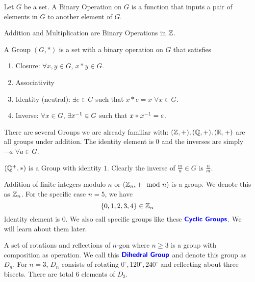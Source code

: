 \begin{definition*}
    Let $G$ be a set. A \alert{Binary Operation} on $G$ is a function that inputs a pair of elements in $G$ to another element of $G$.
\end{definition*}
\begin{example*}
    Addition and Multiplication are Binary Operations in $\mathbb Z$.
\end{example*}
\begin{definition*}
    A \alert{Group} $(G,\ast)$ is a set with a binary operation on $G$ that satisfies
    \begin{enumerate}
        \item Closure: $\forall x,y \in G$, $x \ast y \in G$.
        \item Associativity
        \item Identity (neutral): $\exists e \in G$ such that $x \ast e = x$ $\forall x \in G$.
        \item Inverse: $\forall x \in G$, $\exists x ^{-1} \in G$ such that $x \ast x ^{-1} = e$.
    \end{enumerate}
\end{definition*}
\begin{example*}
    There are several Groups we are already familiar with: $(\mathbb Z, +),(\mathbb Q, +),(\mathbb R, +)$ are all groups under addition. The identity element
    is $0$ and the inverses are simply $-a$ $ \forall a \in G$.
\end{example*}
\begin{example*}
    $(\mathbb Q^+,*)$ is a Group with identity $1$. Clearly the inverse of $\frac{m}{n} \in G$ is $\frac{n}{m}$.
\end{example*}
\begin{example*}
    Addition of finite integers modulo $n$ or $(\mathbb Z_n, + \mod n)$ is a group. We denote this as $\mathbb Z_n$. For the specific case $n= 5$, we have
    \[ \{ 0,1,2,3,4\} \in \mathbb Z_n\]
    Identity element is $0$. We also call specific groups like these $\textbf{\color{blue}\sffamily Cyclic Groups}$. We will learn about them later.
\end{example*}
\begin{example*}
    A set of rotations and reflections of $n$-gon where $n \ge 3$ is a group with composition as operation. We call this $\textbf{\color{blue}\sffamily Dihedral
    Group}$ and denote this group as $D_n$.
    For $n =3$, $D_n$ consists of rotating $0^\circ, 120^ \circ ,240 ^\circ$ and reflecting about three bisects. There are total $6$
    elements of $D_3$.
\end{example*}
